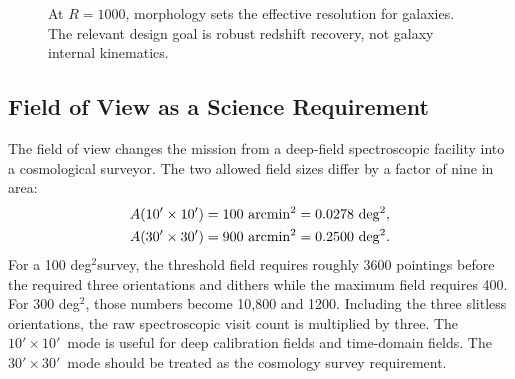 \documentclass[10pt,onecolumn]{article}
\newcommand{\degti}{deg$^2$}
\newcommand{\fovsmall}{$10'\!\times10'$}
\newcommand{\fovlarge}{$30'\!\times30'$}
\begin{document}
\begin{figure}[tp]
\centering
{}
\caption{At $R=1000$, morphology sets the effective resolution for galaxies. The relevant design goal is robust redshift recovery, not galaxy internal kinematics.}
\label{fig:reff1000}
\end{figure}

\subsection{Field of View as a Science Requirement}

The field of view changes the mission from a deep-field spectroscopic facility into a cosmological surveyor. The two allowed field sizes differ by a factor of nine in area:
\begin{align}
  A(10'\times10') &= 100\ {\rm arcmin^2}=0.0278\ {\rm deg^2},\\
  A(30'\times30') &= 900\ {\rm arcmin^2}=0.2500\ {\rm deg^2}.
\end{align}
For a 100 \degti survey, the threshold field requires roughly 3600 pointings before the required three orientations and dithers while the maximum field requires 400. For 300 \degti, those numbers become 10,800 and 1200. Including the three slitless orientations, the raw spectroscopic visit count is multiplied by three. The \fovsmall\ mode is useful for deep calibration fields and time-domain fields. The \fovlarge\ mode should be treated as the cosmology survey requirement.
\end{document}
